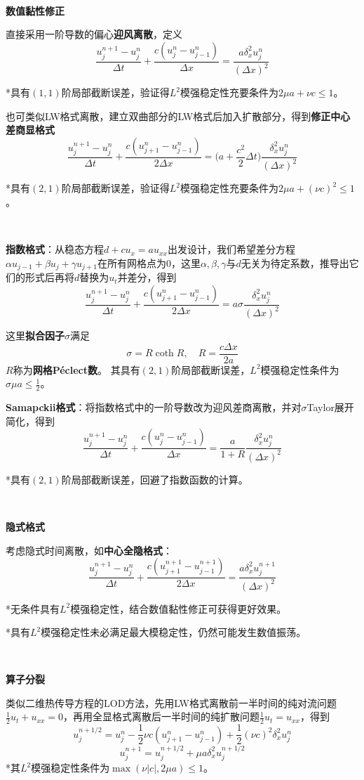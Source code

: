 \documentclass[a4paper,UTF8,fontset=windows]{ctexart}
\begin{document}
\

\textbf{数值黏性修正}

直接采用一阶导数的偏心\textbf{迎风离散}，定义
$$\frac{u_j^{n+1}-u_j^n}{\Delta t}+\frac{c(u_j^n-u_{j-1}^n)}{\Delta x}=\frac{a\delta_x^2u_j^n}{(\Delta x)^2}$$

*具有$(1,1)$阶局部截断误差，验证得$L^2$模强稳定性充要条件为$2\mu a+\nu c\le1$。

也可类似LW格式离散，建立双曲部分的LW格式后加入扩散部分，得到\textbf{修正中心差商显格式}
$$\frac{u_j^{n+1}-u_j^n}{\Delta t}+\frac{c(u_{j+1}^n-u_{j-1}^n)}{2\Delta x}=\bigg(a+\frac{c^2}{2}\Delta t\bigg)\frac{\delta_x^2u_j^n}{(\Delta x)^2}$$

*具有$(2,1)$阶局部截断误差，验证得$L^2$模强稳定性充要条件为$2\mu a+(\nu c)^2\le1$。

\

\textbf{指数格式}：从稳态方程$d+cu_x=au_{xx}$出发设计，我们希望差分方程$\alpha u_{j-1}+\beta u_j+\gamma u_{j+1}$在所有网格点为0，这里$\alpha,\beta,\gamma$与$d$无关为待定系数，推导出它们的形式后再将$d$替换为$u_t$并差分，得到
$$\frac{u_j^{n+1}-u_j^n}{\Delta t}+\frac{c(u_{j+1}^n-u_{j-1}^n)}{2\Delta x}=a\sigma\frac{\delta_x^2u_j^n}{(\Delta x)^2}$$

这里\textbf{拟合因子}$\sigma$满足
$$\sigma=R\coth R,\quad R=\frac{c\Delta x}{2a}$$
$R$称为\textbf{网格P\'eclect数}。
其具有$(2,1)$阶局部截断误差，$L^2$模强稳定性条件为$\sigma\mu a\le\frac{1}{2}$。

\textbf{Samapckii格式}：将指数格式中的一阶导数改为迎风差商离散，并对$\sigma$Taylor展开简化，得到
$$\frac{u_j^{n+1}-u_j^n}{\Delta t}+\frac{c(u_j^n-u_{j-1}^n)}{\Delta x}=\frac{a}{1+R}\frac{\delta_x^2u_j^n}{(\Delta x)^2}$$

*具有$(2,1)$阶局部截断误差，回避了指数函数的计算。

\

\textbf{隐式格式}

考虑隐式时间离散，如\textbf{中心全隐格式}：
$$\frac{u_j^{n+1}-u_j^n}{\Delta t}+\frac{c(u_{j+1}^{n+1}-u_{j-1}^{n+1})}{2\Delta x}=\frac{a\delta_x^2u_j^{n+1}}{(\Delta x)^2}$$

*无条件具有$L^2$模强稳定性，结合数值黏性修正可获得更好效果。

*具有$L^2$模强稳定性未必满足最大模稳定性，仍然可能发生数值振荡。

\

\textbf{算子分裂}

类似二维热传导方程的LOD方法，先用LW格式离散前一半时间的纯对流问题$\frac{1}{2}u_t+u_{xx}=0$，再用全显格式离散后一半时间的纯扩散问题$\frac{1}{2}u_t=u_{xx}$，得到
$$u_j^{n+1/2}=u_j^n-\frac{1}{2}\nu c(u_{j+1}^n-u_{j-1}^n)+\frac{1}{2}(\nu c)^2\delta_x^2u_j^n$$
$$u_j^{n+1}=u_j^{n+1/2}+\mu a\delta_x^2u_j^{n+1/2}$$
*其$L^2$模强稳定性条件为$\max(\nu|c|,2\mu a)\le1$。
\end{document}
